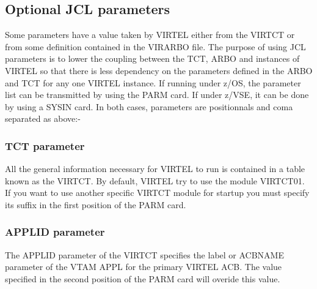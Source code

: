 \documentclass[letterpaper,10pt,english]{sphinxmanual}
\begin{document}
\subsection{Optional JCL parameters}
\label{\detokenize{Installation_Guide:optional-jcl-parameters}}\label{\detokenize{Installation_Guide:index-10}}
Some parameters have a value taken by VIRTEL either from the VIRTCT or from some definition contained in the
VIRARBO file. The purpose of using JCL parameters is to lower the coupling between the TCT, ARBO and instances of
VIRTEL so that there is less dependency on the parameters defined in the ARBO and TCT for any one VIRTEL instance.
If running under z/OS, the parameter list can be transmitted by using the PARM card. If under z/VSE, it can be done by
using a SYSIN card. In both cases, parameters are positionnals and coma separated as above:-

\begin{sphinxVerbatim}[commandchars=\\\{\}]
\end{sphinxVerbatim}


\subsubsection{TCT parameter}
\label{\detokenize{Installation_Guide:tct-parameter}}\label{\detokenize{Installation_Guide:index-11}}
All the general information necessary for VIRTEL to run is contained in a table known as the VIRTCT. By default, VIRTEL
try to use the module VIRTCT01. If you want to use another specific VIRTCT module for startup you must specify its
suffix in the first position of the PARM card.


\subsubsection{APPLID parameter}
\label{\detokenize{Installation_Guide:applid-parameter}}\label{\detokenize{Installation_Guide:index-12}}
The APPLID parameter of the VIRTCT specifies the label or ACBNAME parameter of the VTAM APPL for the primary
VIRTEL ACB. The value specified in the second position of the PARM card will overide this value.
\end{document}
